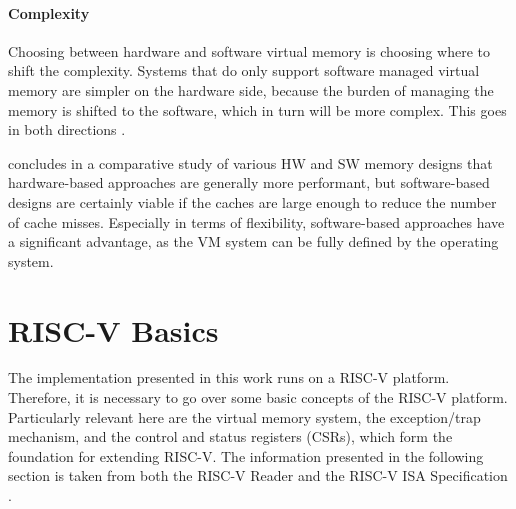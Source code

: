 \paragraph{Complexity} Choosing between hardware and software virtual memory is choosing where to shift the complexity.
Systems that do only support software managed virtual memory are simpler on the hardware side, because the burden of managing the memory is shifted to the software, which in turn will be more complex.
This goes in both directions \cite{issue}.

\cite{jacob1998look} concludes in a comparative study of various HW and SW memory designs
that hardware-based approaches are generally more performant, but software-based designs are certainly
viable if the caches are large enough to reduce the number of cache misses.
Especially in terms of flexibility, software-based approaches have a significant advantage,
as the VM system can be fully defined by the operating system.








\section{RISC-V Basics}
The implementation presented in this work runs on a RISC-V platform. Therefore, it is necessary
to go over some basic concepts of the RISC-V platform. Particularly relevant here are the virtual
memory system, the exception/trap mechanism, and the control and status registers (CSRs), which
form the foundation for extending RISC-V.
The information presented in the following section is taken from both the RISC-V Reader \cite{riscvreader} and the RISC-V ISA Specification \cite{RISCVInstructionSet}.

